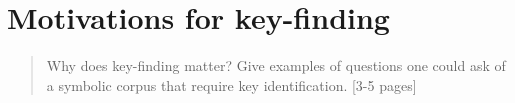 \chapter{Motivations for key-finding}
\label{chap:chap5}

\begin{quote}
    Why does key-finding matter? Give examples of questions one could ask of a symbolic corpus that require key identification. [3-5 pages]
\end{quote}
\clearpage








